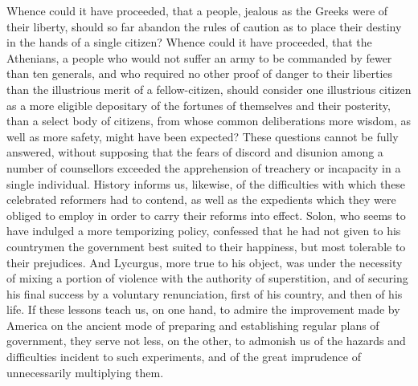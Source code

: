 Whence could it have proceeded, that a people, jealous as the Greeks were of their liberty, should so far abandon the rules of caution as to place their destiny in the hands of a single citizen? 
Whence could it have proceeded, that the Athenians, a people who would not suffer an army to be commanded by fewer than ten generals, and who required no other proof of danger to their liberties than the illustrious merit of a fellow-citizen, should consider one illustrious citizen as a more eligible depositary of the fortunes of themselves and their posterity, than a select body of citizens, from whose common deliberations more wisdom, as well as more safety, might have been expected? 
These questions cannot be fully answered, without supposing that the fears of discord and disunion among a number of counsellors exceeded the apprehension of treachery or incapacity in a single individual. 
History informs us, likewise, of the difficulties with which these celebrated reformers had to contend, as well as the expedients which they were obliged to employ in order to carry their reforms into effect. 
Solon, who seems to have indulged a more temporizing policy, confessed that he had not given to his countrymen the government best suited to their happiness, but most tolerable to their prejudices. 
And Lycurgus, more true to his object, was under the necessity of mixing a portion of violence with the authority of superstition, and of securing his final success by a voluntary renunciation, first of his country, and then of his life. 
If these lessons teach us, on one hand, to admire the improvement made by America on the ancient mode of preparing and establishing regular plans of government, they serve not less, on the other, to admonish us of the hazards and difficulties incident to such experiments, and of the great imprudence of unnecessarily multiplying them.


